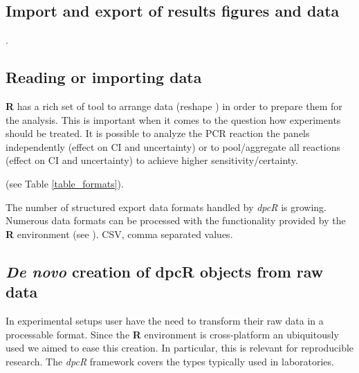 \documentclass[a4,center,fleqn]{NAR}
\begin{document}
\subsection{Import and export of results figures and data}.


\subsection{Reading or importing data}

\textbf{R} has a rich set of tool to arrange data (reshape \cite{Wickham_2007}) 
in order to prepare them for the analysis. This is important when it comes to 
the question how experiments should be treated. It is possible to analyze the 
PCR reaction the panels independently (effect on CI and uncertainty) or to 
pool/aggregate all reactions (effect on CI and uncertainty) to achieve higher 
sensitivity/certainty.


(see Table \ref{table_formats}).

\begin{table}[b]
 {The number of structured export data formats handled by \textit{dpcR} is 
growing. Numerous data formats can be processed with the functionality provided 
by the \textbf{R} environment (see \cite{rodiger_r_2015}). CSV, comma separated 
values.}
\end{table}

\subsection{\textit{De novo} creation of dpcR objects from raw data}

In experimental setups user have the need to transform their raw data in a 
processable format. Since the \textbf{R} environment is cross-platform an 
ubiquitously used we aimed to ease this creation. In particular, this is 
relevant for reproducible research. The \textit{dpcR} framework covers the types 
typically used in laboratories.
\end{document}
